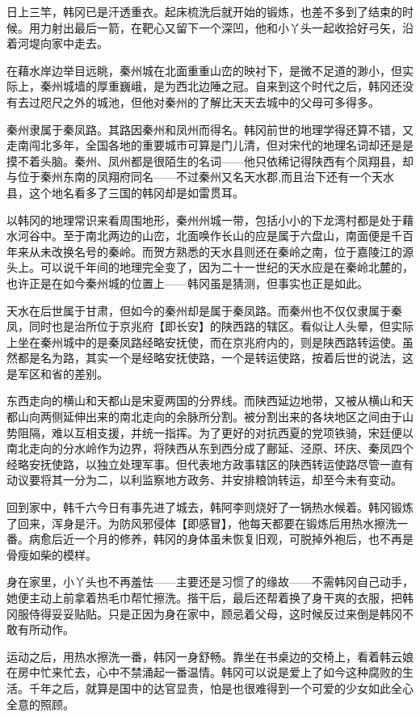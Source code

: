 日上三竿，韩冈已是汗透重衣。起床梳洗后就开始的锻炼，也差不多到了结束的时候。用力射出最后一箭，在靶心又留下一个深凹，他和小丫头一起收拾好弓矢，沿着河堤向家中走去。

在藉水岸边举目远眺，秦州城在北面重重山峦的映衬下，是微不足道的渺小，但实际上，秦州城墙的厚重巍峨，是为西北边陲之冠。自来到这个时代之后，韩冈还没有去过咫尺之外的城池，但他对秦州的了解比天天去城中的父母可多得多。

秦州隶属于秦凤路。其路因秦州和凤州而得名。韩冈前世的地理学得还算不错，又走南闯北多年，全国各地的重要城市可算是门儿清，但对宋代的地理名词却还是是摸不着头脑。秦州、凤州都是很陌生的名词——他只依稀记得陕西有个凤翔县，却与位于秦州东南的凤翔府同名——不过秦州又名天水郡,而且治下还有一个天水县，这个地名看多了三国的韩冈却是如雷贯耳。

以韩冈的地理常识来看周围地形，秦州州城一带，包括小小的下龙湾村都是处于藉水河谷中。至于南北两边的山峦，北面唤作长山的应是属于六盘山，南面便是千百年来从未改换名号的秦岭。而贺方熟悉的天水县则还在秦岭之南，位于嘉陵江的源头上。可以说千年间的地理完全变了，因为二十一世纪的天水应是在秦岭北麓的，也许正是在如今秦州城的位置上——韩冈虽是猜测，但事实也正是如此。

天水在后世属于甘肃，但如今的秦州却是属于秦凤路。而秦州也不仅仅隶属于秦凤，同时也是治所位于京兆府【即长安】的陕西路的辖区。看似让人头晕，但实际上坐在秦州城中的是秦凤路经略安抚使，而在京兆府内的，则是陕西路转运使。虽然都是名为路，其实一个是经略安抚使路，一个是转运使路，按着后世的说法，这是军区和省的差别。

东西走向的横山和天都山是宋夏两国的分界线。而陕西延边地带，又被从横山和天都山向两侧延伸出来的南北走向的余脉所分割。被分割出来的各块地区之间由于山势阻隔，难以互相支援，并统一指挥。为了更好的对抗西夏的党项铁骑，宋廷便以南北走向的分水岭作为边界，将陕西从东到西分成了鄜延、泾原、环庆、秦凤四个经略安抚使路，以独立处理军事。但代表地方政事辖区的陕西转运使路尽管一直有动议要将其一分为二，以利监察地方政务、并安排粮饷转运，却至今未有变动。

回到家中，韩千六今日有事先进了城去，韩阿李则烧好了一锅热水候着。韩冈锻炼了回来，浑身是汗。为防风邪侵体【即感冒】，他每天都要在锻炼后用热水擦洗一番。病愈后近一个月的修养，韩冈的身体虽未恢复旧观，可脱掉外袍后，也不再是骨瘦如柴的模样。

身在家里，小丫头也不再羞怯——主要还是习惯了的缘故——不需韩冈自己动手，她便主动上前拿着热毛巾帮忙擦洗。揩干后，最后还帮着换了身干爽的衣服，把韩冈服侍得妥妥贴贴。只是正因为身在家中，顾忌着父母，这时候反过来倒是韩冈不敢有所动作。

运动之后，用热水擦洗一番，韩冈一身舒畅。靠坐在书桌边的交椅上，看着韩云娘在房中忙来忙去，心中不禁涌起一番温情。韩冈可以说是爱上了如今这种腐败的生活。千年之后，就算是国中的达官显贵，怕是也很难得到一个可爱的少女如此全心全意的照顾。

